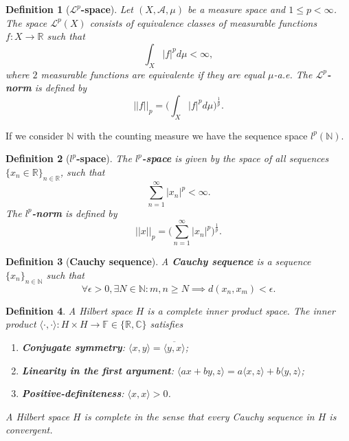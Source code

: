 \documentclass[]{article}
\newtheorem{definition}{Definition}
\newcommand{\innerproduct}[2]{\langle #1, #2 \rangle}
\begin{document}
\begin{definition}[\textbf{$\mathcal{L}^p$-space}]
Let $(X,\mathcal{A}, \mu)$ be a measure space and $1 \leq p < \infty$. The space $\mathcal{L}^p(X)$ consists of equivalence classes of measurable functions $f:X \to \mathbb{R}$ such that
\begin{equation}
	\int_X |f|^p d \mu < \infty,
\end{equation}
where $2$ measurable functions are equivalente if they are equal $\mu$-a.e. The \textbf{$\mathcal{L}^p$-norm} is defined by
\begin{equation}
	||f||_p = \bigg(\int_X |f|^p d\mu\bigg)^{\frac{1}{p}}.
\end{equation}
\end{definition}
If we consider $\mathbb{N}$ with the counting measure we have the sequence space $l^p(\mathbb{N})$.
\begin{definition}[\textbf{$l^p$-space}]
The \textbf{$l^p$-space} is given by the space of all sequences $\{x_n \in \mathbb{R}\}_{n \in \mathbb{R}}$, such that
\begin{equation}
	\sum_{n=1}^{\infty} |x_n|^p < \infty.
\end{equation}
The \textbf{$l^p$-norm} is defined by
\begin{equation}
	||x||_p = \bigg(\sum_{n=1}^{\infty} |x_n|^p\bigg)^{\frac{1}{p}}.
\end{equation}
\end{definition}
\begin{definition}[\textbf{Cauchy sequence}]
A \textbf{Cauchy sequence} is a sequence $\{x_n\}_{n \in \mathbb{N}}$ such that
\begin{equation}
	\forall \epsilon > 0, \exists N \in \mathbb{N} : m,n \geq N \implies d(x_n,x_m)<\epsilon.
\end{equation}
\end{definition}
\begin{definition}
A Hilbert space $H$ is a complete inner product space. The inner product $\langle \cdot, \cdot \rangle : H \times H \to \mathbb{F} \in \{\mathbb{R}, \mathbb{C}\}$ satisfies
\begin{enumerate}
	\item \textbf{Conjugate symmetry}: $\innerproduct{x}{y} = \overline{\innerproduct{y}{x}}$;
	\item \textbf{Linearity in the first argument}: $\innerproduct{ax+by}{z} = a\innerproduct{x}{z} + b \innerproduct{y}{z}$;
	\item \textbf{Positive-definiteness}: $\innerproduct{x}{x}>0$.
\end{enumerate}
A Hilbert space $H$ is complete in the sense that every Cauchy sequence in $H$ is convergent.
\end{definition}
\end{document}
